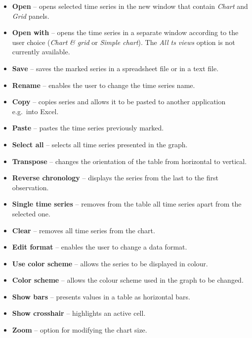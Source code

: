 \documentclass[
  letterpaper,
  DIV=11,
  numbers=noendperiod]{scrreprt}
\begin{document}
\begin{itemize}
\item
  \textbf{Open} -- opens selected time series in the new window that
  contain \emph{Chart} and \emph{Grid} panels.
\item
  \textbf{Open with} -- opens the time series in a separate window
  according to the user choice (\emph{Chart} \emph{\& grid} or
  \emph{Simple chart}). The \emph{All ts views} option is not currently
  available.
\item
  \textbf{Save} -- saves the marked series in a spreadsheet file or in a
  text file.
\item
  \textbf{Rename} -- enables the user to change the time series name.
\item
  \textbf{Copy} -- copies series and allows it to be pasted to another
  application e.g.~into Excel.
\item
  \textbf{Paste} -- pastes the time series previously marked.
\item
  \textbf{Select all} -- selects all time series presented in the graph.
\item
  \textbf{Transpose} -- changes the orientation of the table from
  horizontal to vertical.
\item
  \textbf{Reverse chronology} -- displays the series from the last to
  the first observation.
\item
  \textbf{Single time series} -- removes from the table all time series
  apart from the selected one.
\item
  \textbf{Clear} -- removes all time series from the chart.
\item
  \textbf{Edit format} -- enables the user to change a data format.
\item
  \textbf{Use color scheme} -- allows the series to be displayed in
  colour.
\item
  \textbf{Color scheme} -- allows the colour scheme used in the graph to
  be changed.
\item
  \textbf{Show bars} -- presents values in a table as horizontal bars.
\item
  \textbf{Show crosshair} -- highlights an active cell.
\item
  \textbf{Zoom} -- option for modifying the chart size.
\end{itemize}
\end{document}
